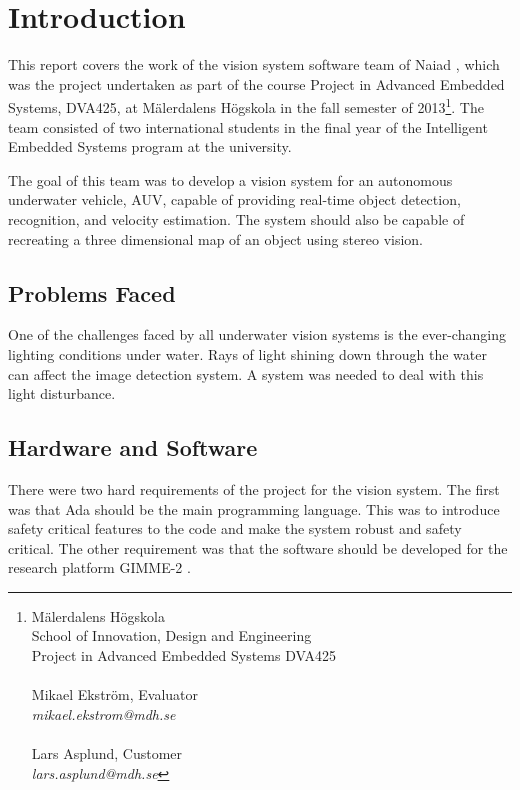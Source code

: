 \section{Introduction}\label{sec:introduction}
This report covers the work of the vision system software team of Naiad \cite{web:naiad}, which was the project undertaken as part of the course Project in Advanced Embedded Systems, DVA425, at M\"{a}lerdalens H\"{o}gskola in the fall semester of 2013\footnote{M\"{a}lerdalens H\"{o}gskola \\School of Innovation, Design and Engineering\\Project in Advanced Embedded Systems DVA425\\ \\Mikael Ekstr\"{o}m, Evaluator \\ \textit{mikael.ekstrom@mdh.se}\\ \\Lars Asplund, Customer\\ \textit{lars.asplund@mdh.se}}. The team consisted of two international students in the final year of the Intelligent Embedded Systems program at the university.

The goal of this team was to develop a vision system for an autonomous underwater vehicle, AUV, capable of providing real-time object detection, recognition, and velocity estimation. The system should also be capable of recreating a three dimensional map of an object using stereo vision.

\subsection{Problems Faced}
One of the challenges faced by all underwater vision systems is the ever-changing lighting conditions under water. Rays of light shining down through the water can affect the image detection system. A system was needed to deal with this light disturbance.

\subsection{Hardware and Software}
There were two hard requirements of the project for the vision system. The first was that Ada \cite{web:mcsada} should be the main programming language. This was to introduce safety critical features to the code and make the system robust and safety critical. The other requirement was that the software should be developed for the research platform GIMME-2 \cite{web:GIMME2}. 

